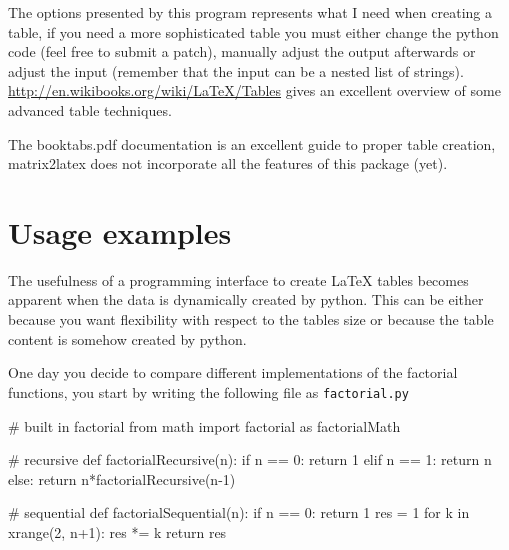 {{The options presented by this program represents what I need when creating a table,
if you need a more sophisticated table you must either change the python code
(feel free to submit a patch), manually adjust the output afterwards
or adjust the input (remember that the input can be a nested list of strings).
\url{http://en.wikibooks.org/wiki/LaTeX/Tables} gives an excellent overview
of some advanced table techniques.

The booktabs.pdf documentation is an excellent guide to proper table creation,
matrix2latex does not incorporate all the features of this package (yet).

\section{Usage examples}
The usefulness of a programming interface to create \LaTeX{}
tables becomes apparent when the data is dynamically created by python.
This can be either because you want flexibility with respect to the tables size
or because the table content is somehow created by python.

One day you decide to compare different implementations of the
factorial functions, you start by writing the following file
as \verb!factorial.py!
\begin{pyblock}[factorial]
# built in factorial
from math import factorial as factorialMath

# recursive
def factorialRecursive(n):
    if n == 0:
        return 1
    elif n == 1:
        return n
    else:
        return n*factorialRecursive(n-1)

# sequential
def factorialSequential(n):
    if n == 0:
        return 1
    res = 1
    for k in xrange(2, n+1):
        res *= k
    return res  
\end{pyblock}

}}
